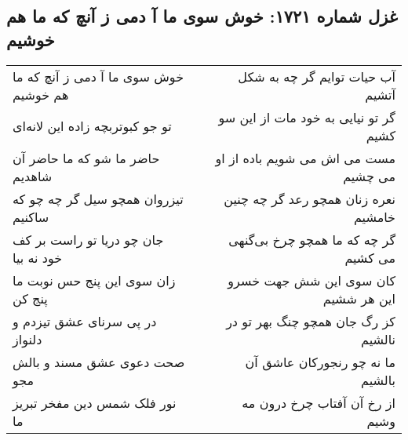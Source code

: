 \begin{center}
\section*{غزل شماره ۱۷۲۱: خوش سوی ما آ دمی ز آنچ که ما هم خوشیم}
\label{sec:1721}
\begin{longtable}{l p{0.5cm} r}
خوش سوی ما آ دمی ز آنچ که ما هم خوشیم
&&
آب حیات توایم گر چه به شکل آتشیم
\\
تو جو کبوتربچه زاده این لانه‌ای
&&
گر تو نیایی به خود مات از این سو کشیم
\\
حاضر ما شو که ما حاضر آن شاهدیم
&&
مست می اش می شویم باده از او می چشیم
\\
تیزروان همچو سیل گر چه چو که ساکنیم
&&
نعره زنان همچو رعد گر چه چنین خامشیم
\\
جان چو دریا تو راست بر کف خود نه بیا
&&
گر چه که ما همچو چرخ بی‌گنهی می کشیم
\\
زان سوی این پنج حس نوبت ما پنج کن
&&
کان سوی این شش جهت خسرو این هر ششیم
\\
در پی سرنای عشق تیزدم و دلنواز
&&
کز رگ جان همچو چنگ بهر تو در نالشیم
\\
صحت دعوی عشق مسند و بالش مجو
&&
ما نه چو رنجورکان عاشق آن بالشیم
\\
نور فلک شمس دین مفخر تبریز ما
&&
از رخ آن آفتاب چرخ درون مه وشیم
\\
\end{longtable}
\end{center}
